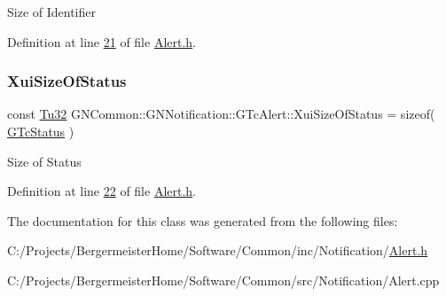Size of Identifier 

Definition at line \mbox{\hyperlink{_alert_8h_source_l00021}{21}} of file \mbox{\hyperlink{_alert_8h_source}{Alert.\+h}}.

\mbox{\label{class_g_n_common_1_1_g_n_notification_1_1_g_tc_alert_ae2a0f255e99e8753443532c9da6a2f04}} 
\subsubsection{\texorpdfstring{Xui\+Size\+Of\+Status}{XuiSizeOfStatus}}
{\footnotesize\ttfamily const \mbox{\hyperlink{namespace_g_n_common_a941b527ef318f318aed7903dc832b7e4}{Tu32}} G\+N\+Common\+::\+G\+N\+Notification\+::\+G\+Tc\+Alert\+::\+Xui\+Size\+Of\+Status = sizeof( \mbox{\hyperlink{class_g_n_common_1_1_g_n_notification_1_1_g_tc_status}{G\+Tc\+Status}} )\hspace{0.3cm}{\ttfamily [static]}}

Size of Status 

Definition at line \mbox{\hyperlink{_alert_8h_source_l00022}{22}} of file \mbox{\hyperlink{_alert_8h_source}{Alert.\+h}}.



The documentation for this class was generated from the following files\+:\begin{DoxyCompactItemize}
\item 
C\+:/\+Projects/\+Bergermeister\+Home/\+Software/\+Common/inc/\+Notification/\mbox{\hyperlink{_alert_8h}{Alert.\+h}}\item 
C\+:/\+Projects/\+Bergermeister\+Home/\+Software/\+Common/src/\+Notification/Alert.\+cpp\end{DoxyCompactItemize}
